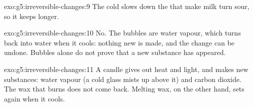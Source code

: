 \begin{solution}{exo:g5:irreversible-changes:9}
The cold slows down the  that make milk turn sour, so
it keeps longer.
\end{solution}

\begin{solution}{exo:g5:irreversible-changes:10}
No. The bubbles are water vapour, which turns back into water when it
cools: nothing new is made, and the change can be undone. Bubbles alone
do not prove that a new substance has appeared.
\end{solution}

\begin{solution}{exo:g5:irreversible-changes:11}
A  candle gives out heat and light, and makes new substances:
water vapour (a cold glass mists up above it) and carbon dioxide. The
wax that burns does not come back. Melting wax, on the other hand, sets
again when it cools.
\end{solution}
